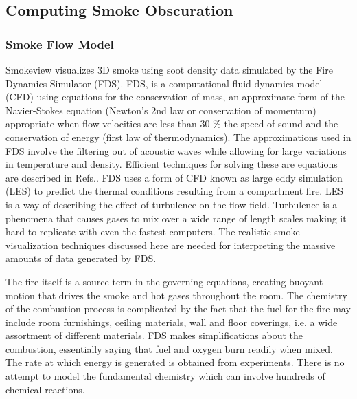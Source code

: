 \cite{stam:99a}\cite{sayood:96a}\cite{Bajaj:01a}\cite{Levoy:90a}
\cite{Sabella:88a}\cite{Gardner:85a}

\subsection{Computing Smoke Obscuration}
\subsubsection{Smoke Flow Model}
 \label{section:firemodel}


Smokeview visualizes 3D smoke using soot density data simulated by
the Fire Dynamics Simulator (FDS)\cite{FDS_Tech_Guide_4}.  FDS, is
a computational fluid dynamics model (CFD) using equations for the
conservation of mass, an approximate form of the Navier-Stokes
equation (Newton's 2nd law or conservation of momentum)
appropriate when flow velocities are less than 30 \% the speed of
sound and the conservation of energy (first law of
thermodynamics). The approximations used in FDS involve the
filtering out of acoustic waves while allowing for large
variations in temperature and density\cite{Rehm:1}.  Efficient
techniques for solving these are equations are described in
Refs.\cite{McGrattan:1,Baum:1}. FDS uses a form of CFD known as
large eddy simulation (LES) to predict the thermal conditions
resulting from a compartment fire. LES is a way of describing the
effect of turbulence on the flow field. Turbulence is a phenomena
that causes gases to mix over a wide range of length scales making
it hard to replicate with even the fastest computers. The
realistic smoke visualization techniques discussed here are needed
for interpreting the massive amounts of data generated by FDS.

The fire itself is a source term in the governing equations,
creating buoyant motion that drives the smoke and hot gases
throughout the room. The chemistry of the combustion process is
complicated by the fact that the fuel for the fire may include
room furnishings, ceiling materials, wall and floor coverings,
i.e. a wide assortment of different materials. FDS makes
simplifications about the combustion, essentially saying that fuel
and oxygen burn readily when mixed. The rate at which energy is
generated is obtained from experiments. There is no attempt to
model the fundamental chemistry which can involve hundreds of
chemical reactions.

